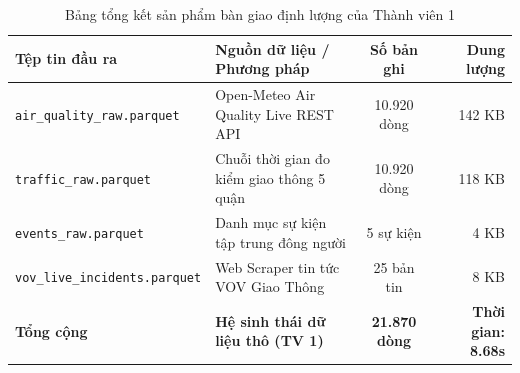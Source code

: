 \documentclass[12pt,a4paper]{article}
\begin{document}
\begin{table}[h]
\centering
\caption{Bảng tổng kết sản phẩm bàn giao định lượng của Thành viên 1}
\label{tab:tv1_results}
\begin{tabularx}{\textwidth}{lXcr}
\toprule
\textbf{Tệp tin đầu ra} & \textbf{Nguồn dữ liệu / Phương pháp} & \textbf{Số bản ghi} & \textbf{Dung lượng} \\
\midrule
\texttt{air\_quality\_raw.parquet} & Open-Meteo Air Quality Live REST API & 10.920 dòng & 142 KB \\
\texttt{traffic\_raw.parquet} & Chuỗi thời gian đo kiểm giao thông 5 quận & 10.920 dòng & 118 KB \\
\texttt{events\_raw.parquet} & Danh mục sự kiện tập trung đông người & 5 sự kiện & 4 KB \\
\texttt{vov\_live\_incidents.parquet} & Web Scraper tin tức VOV Giao Thông & 25 bản tin & 8 KB \\
\midrule
\textbf{Tổng cộng} & \textbf{Hệ sinh thái dữ liệu thô (TV 1)} & \textbf{21.870 dòng} & \textbf{Thời gian: 8.68s} \\
\bottomrule
\end{tabularx}
\end{table}
\end{document}
